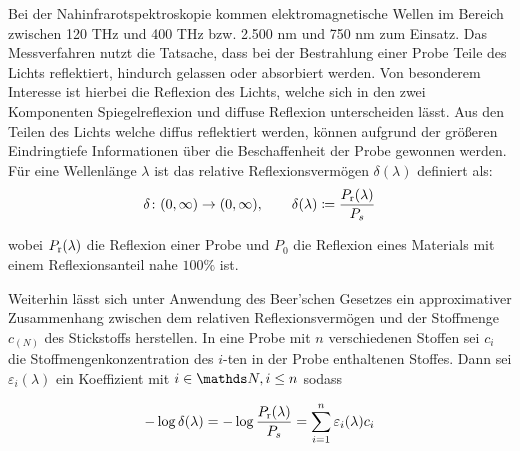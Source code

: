 		Bei der Nahinfrarotspektroskopie kommen elektromagnetische Wellen im Bereich zwischen 120 THz und 400 THz bzw. 2.500 nm und 750 nm zum Einsatz. \cite{Agelet2010}
		Das Messverfahren nutzt die Tatsache, dass bei der Bestrahlung einer Probe Teile des Lichts reflektiert, hindurch gelassen oder absorbiert werden.
		Von besonderem Interesse ist hierbei die Reflexion des Lichts, welche sich in den zwei Komponenten Spiegelreflexion und diffuse Reflexion unterscheiden lässt.
		Aus den Teilen des Lichts welche diffus reflektiert werden, können aufgrund der größeren Eindringtiefe Informationen über die Beschaffenheit der Probe gewonnen werden. \cite{Agelet2010}
		Für eine Wellenlänge $\lambda$ ist das relative Reflexionsvermögen $\delta(\lambda)$ definiert als:
		\[
			\delta\colon(0,\infty)\to(0,\infty),\qquad \delta(\lambda) \coloneqq \frac{P_{\mathrm{r}}(\lambda)}{P_s}
		\]
		
		wobei $P_{\mathrm{r}}(\lambda)$ die Reflexion einer Probe und $P_0$ die Reflexion eines Materials mit einem Reflexionsanteil nahe $100\%$ ist. 
		
		Weiterhin lässt sich unter Anwendung des Beer'schen Gesetzes ein approximativer Zusammenhang zwischen dem relativen Reflexionsvermögen und der Stoffmenge $c_{(N)}$ des Stickstoffs herstellen.
		In eine Probe mit $n$ verschiedenen Stoffen sei $c_i$ die Stoffmengenkonzentration des $i$-ten in der Probe enthaltenen Stoffes. 
		Dann sei $\varepsilon_i(\lambda)$ ein Koeffizient mit $i\in\SN,i\leq n$ sodass
		
		\[
			-\log \delta(\lambda) = -\log \frac{P_{\mathrm{r}}(\lambda)}{P_s} = \sum_{i=1}^{n} \varepsilon_i(\lambda) c_i
		\]




